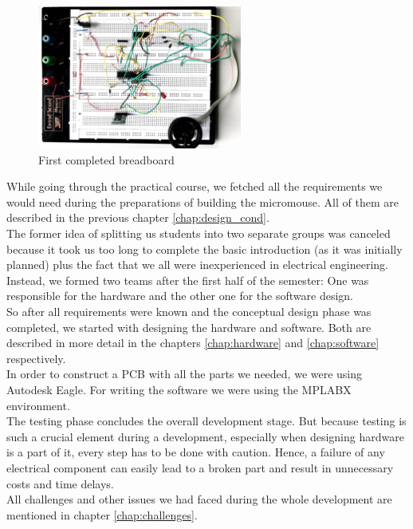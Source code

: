 \begin{figure}[H]
    \centering
    \includegraphics[width=0.6\textwidth]{figures/hardware/breadboard.jpeg}
    \caption{First completed breadboard}
    \label{fig:breadboard}
\end{figure}

\noindent
While going through the practical course, we fetched all the requirements we would need during the preparations of building the micromouse. All of them are described in the previous chapter \ref{chap:design_cond}.\\

\noindent
The former idea of splitting us students into two separate groups was canceled because it took us too long to complete the basic introduction (as it was initially planned) plus the fact that we all were inexperienced in electrical engineering. Instead, we formed two teams after the first half of the semester: One was responsible for the hardware and the other one for the software design.\\
So after all requirements were known and the conceptual design phase was completed, we started with designing the hardware and software. Both are described in more detail in the chapters \ref{chap:hardware} and \ref{chap:software} respectively. \\
In order to construct a PCB with all the parts we needed, we were using Autodesk Eagle. For writing the software we were using the MPLABX environment. \\

\noindent
The testing phase concludes the overall development stage. But because testing is such a crucial element during a development, especially when designing hardware is a part of it, every step has to be done with caution. Hence, a failure of any electrical component can easily lead to a broken part and result in unnecessary costs and time delays.\\

\noindent
All challenges and other issues we had faced during the whole development are mentioned in chapter \ref{chap:challenges}.\\